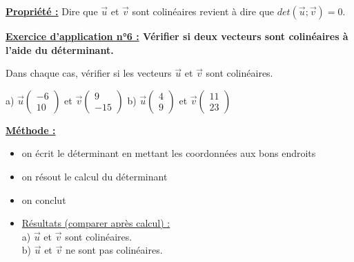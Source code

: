 \documentclass[12pt]{article}
\newcommand*{\Coord}[2]{%
  \ensuremath{
    \begin{pmatrix} 
      #1\\ 
      #2 
    \end{pmatrix}}}
\begin{document}
\vspace{10pt}

\begin{mdframed}[
    linewidth=1pt,
    roundcorner=5pt,
    linecolor=Red,
    innertopmargin=10pt,
    innerbottommargin=10pt
]
{\color{Red}\textbf{\underline{Propriété :}}}
Dire que $\overrightarrow{u}$ et $\overrightarrow{v}$ sont colinéaires revient à dire que 
$det(\overrightarrow{u};\overrightarrow{v}) = 0$.
\end{mdframed}

\vspace{10pt}

\begin{mdframed}[
    linewidth=1pt,
    roundcorner=5pt,
    linecolor=RoyalBlue,
    innertopmargin=10pt,
    innerbottommargin=10pt
]
{\color{RoyalBlue}\textbf{\underline{Exercice d'application n°6 :} 
Vérifier si deux vecteurs sont colinéaires à l'aide du déterminant.}}
\vspace{10pt}

Dans chaque cas, vérifier si les vecteurs $\overrightarrow{u}$ et $\overrightarrow{v}$ 
sont colinéaires.

a) $\overrightarrow{u}\Coord{-6}{10}$ et $\overrightarrow{v}\Coord{9}{-15}$
\hspace{1cm} b) $\overrightarrow{u}\Coord{4}{9}$ et $\overrightarrow{v}\Coord{11}{23}$

\begin{mdframed}[
    linewidth=1pt,
    roundcorner=5pt,
    linecolor=black,
    innertopmargin=10pt,
    innerbottommargin=10pt,
    backgroundcolor=gray!15
]
\underline{\textbf{Méthode :}}
\begin{itemize}
    \item on écrit le déterminant en mettant les coordonnées aux bons endroits
    \item on résout le calcul du déterminant
    \item on conclut
    \item \underline{Résultats (comparer après calcul) :}\\
    a) $\overrightarrow{u}$ et $\overrightarrow{v}$ sont colinéaires.
    \\b) $\overrightarrow{u}$ et $\overrightarrow{v}$ ne sont pas colinéaires.
\end{itemize}
\end{mdframed}

\end{mdframed}

\vspace{20pt}
\end{document}
